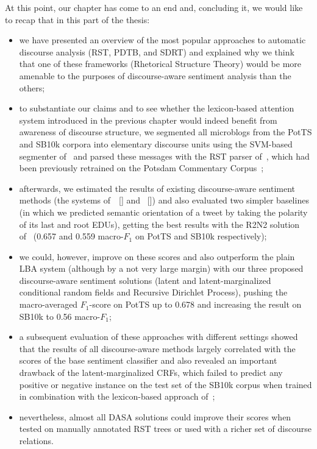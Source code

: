 \documentclass[11pt]{article}
\newcommand{\F}[0]{$F_1$}
\begin{document}
At this point, our chapter has come to an end and, concluding it, we
would like to recap that in this part of the thesis:
\begin{itemize}
  \item we have presented an overview of the most popular approaches
    to automatic discourse analysis (RST, PDTB, and SDRT) and
    explained why we think that one of these frameworks (Rhetorical
    Structure Theory) would be more amenable to the purposes of
    discourse-aware sentiment analysis than the others;
  \item to substantiate our claims and to see whether the
    lexicon-based attention system introduced in the previous chapter
    would indeed benefit from awareness of discourse structure, we
    segmented all microblogs from the PotTS and SB10k corpora into
    elementary discourse units using the SVM-based segmenter
    of~\citet{Sidarenka:15} and parsed these messages with the RST
    parser of~\citet{Ji:14}, which had been previously retrained on
    the Potsdam Commentary Corpus~\cite{Stede:14};
  \item afterwards, we estimated the results of existing
    discourse-aware sentiment methods (the systems
    of~\citeauthor{Wang:15}~[\citeyear{Wang:15}] and
    \citeauthor{Bhatia:15}~[\citeyear{Bhatia:15}]) and also evaluated
    two simpler baselines (in which we predicted semantic orientation
    of a tweet by taking the polarity of its last and root EDUs),
    getting the best results with the R2N2 solution
    of~\citet{Bhatia:15} (0.657 and 0.559 macro-\F{} on PotTS and
    SB10k respectively);
  \item we could, however, improve on these scores and also outperform
    the plain LBA system (although by a not very large margin) with
    our three proposed discourse-aware sentiment solutions (latent and
    latent-marginalized conditional random fields and Recursive
    Dirichlet Process), pushing the macro-averaged \F{}-score on PotTS
    up to 0.678 and increasing the result on SB10k to 0.56 macro-\F{};
  \item a subsequent evaluation of these approaches with different
    settings showed that the results of all discourse-aware methods
    largely correlated with the scores of the base sentiment
    classifier and also revealed an important drawback of the
    latent-marginalized CRFs, which failed to predict any positive or
    negative instance on the test set of the SB10k corpus when trained
    in combination with the lexicon-based approach of~\citet{Hu:04};
  \item nevertheless, almost all DASA solutions could improve their
    scores when tested on manually annotated RST trees or used with a
    richer set of discourse relations.
\end{itemize}
\end{document}
